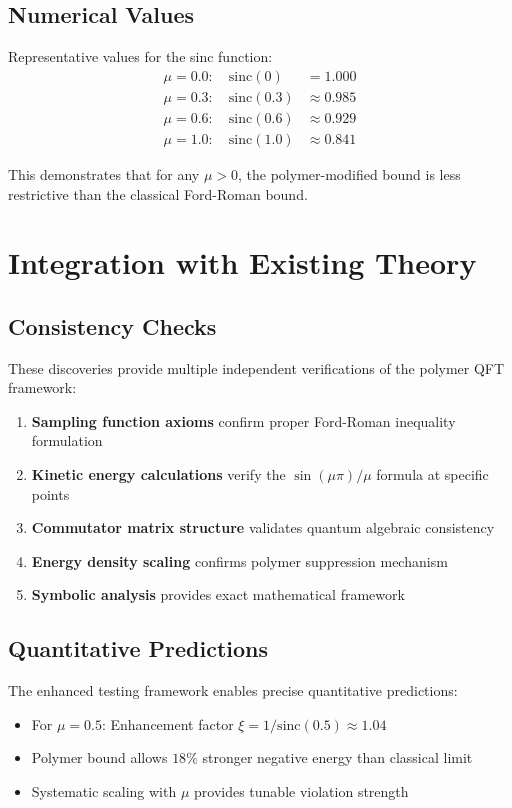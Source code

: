\documentclass[11pt]{article}
\begin{document}
\subsection{Numerical Values}
Representative values for the sinc function:
\begin{align}
\mu = 0.0: \quad \text{sinc}(0) &= 1.000 \\
\mu = 0.3: \quad \text{sinc}(0.3) &\approx 0.985 \\
\mu = 0.6: \quad \text{sinc}(0.6) &\approx 0.929 \\
\mu = 1.0: \quad \text{sinc}(1.0) &\approx 0.841
\end{align}

This demonstrates that for any $\mu > 0$, the polymer-modified bound is less restrictive than the classical Ford-Roman bound.

\section{Integration with Existing Theory}

\subsection{Consistency Checks}
These discoveries provide multiple independent verifications of the polymer QFT framework:

\begin{enumerate}
\item \textbf{Sampling function axioms} confirm proper Ford-Roman inequality formulation
\item \textbf{Kinetic energy calculations} verify the $\sin(\mu\pi)/\mu$ formula at specific points
\item \textbf{Commutator matrix structure} validates quantum algebraic consistency
\item \textbf{Energy density scaling} confirms polymer suppression mechanism
\item \textbf{Symbolic analysis} provides exact mathematical framework
\end{enumerate}

\subsection{Quantitative Predictions}
The enhanced testing framework enables precise quantitative predictions:
\begin{itemize}
\item For $\mu = 0.5$: Enhancement factor $\xi = 1/\text{sinc}(0.5) \approx 1.04$
\item Polymer bound allows $18\%$ stronger negative energy than classical limit
\item Systematic scaling with $\mu$ provides tunable violation strength
\end{itemize}
\end{document}
